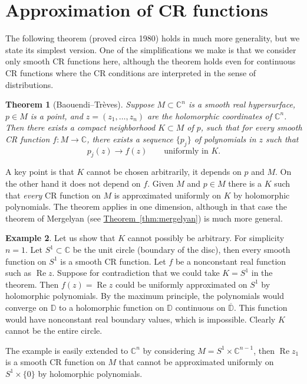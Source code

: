 \documentclass[12pt,openany]{book}
\renewcommand{\Re}{\operatorname{Re}}
\newcommand{\C}{{\mathbb{C}}}
\newcommand{\D}{{\mathbb{D}}}
\theoremstyle{plain}
\newtheorem{thm}{Theorem}[section]
\theoremstyle{remark}
\theoremstyle{definition}
\theoremstyle{exercise}
\theoremstyle{example}
\newtheorem{example}[thm]{Example}
\newcommand{\thmref}[1]{\hyperref[#1]{Theorem~\ref*{#1}}}
\begin{document}
\section{Approximation of CR functions}

The following theorem (proved circa 1980) holds in much more generality, but
we state its simplest version.  One of the simplifications we make is that
we consider only smooth CR functions here, although the theorem holds even
for continuous CR functions where the CR conditions are interpreted in the
sense of distributions.

\begin{thm}[Baouendi--Tr{\`e}ves]%
\pagebreak[2]
Suppose $M \subset \C^n$ is a smooth real hypersurface,
$p \in M$ is a point,
and
$z=(z_1,\dots,z_n)$ are the holomorphic coordinates of $\C^n$.
Then there exists a compact
neighborhood $K \subset M$ of $p$, such that for every smooth CR function $f \colon M \to \C$,
there exists a sequence $\{ p_j \}$ of polynomials in $z$ such that
\begin{equation*}
p_j(z) \to f(z)
\qquad \text{uniformly in $K$.}
\end{equation*}
\end{thm}

A key point is that $K$ cannot be chosen arbitrarily, it depends on $p$ and $M$.
On the other hand it does not depend on $f$.  Given $M$ and $p \in M$
there is a $K$ such that \emph{every} CR function on $M$ is approximated
uniformly on $K$ by holomorphic polynomials.  The theorem applies in one
dimension, although in that case the 
theorem of Mergelyan
(see \thmref{thm:mergelyan}) is much more general.

\begin{example}
Let us show that $K$ cannot possibly be arbitrary.  For simplicity $n=1$.
Let $S^1 \subset \C$ be the unit circle (boundary of the disc),
then every smooth function on $S^1$ is a smooth CR function.  Let $f$
be a nonconstant real function such as $\Re z$.  Suppose for
contradiction that we could take $K = S^1$ in the theorem.  Then $f(z) = \Re
z$ could be uniformly
approximated on $S^1$ by holomorphic polynomials.
By the maximum principle, the
polynomials would converge on $\D$ to a holomorphic function on $\D$
continuous on $\overline{\D}$.  This function would have nonconstant real boundary values,
which is impossible.  Clearly $K$ cannot be the entire circle.

The example is easily extended to $\C^n$
by considering 
$M = S^1 \times \C^{n-1}$, then $\Re z_1$ is a smooth CR function on $M$ that cannot be
approximated uniformly on $S^1 \times \{ 0 \}$ by holomorphic polynomials.
\end{example}
\end{document}
